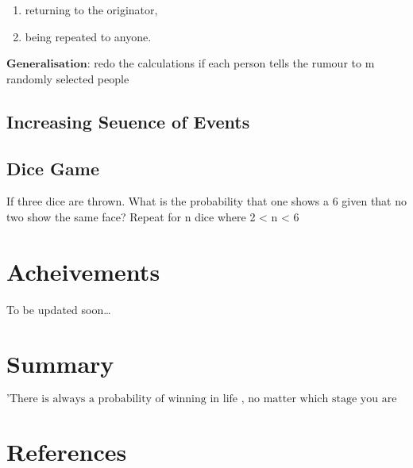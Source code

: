 \documentclass[
  letterpaper,
  DIV=11,
  numbers=noendperiod]{scrreprt}
\newlength{\cslhangindent}
\newenvironment{CSLReferences}[2] %
 {\begin{list}{}{%
  \setlength{\itemindent}{0pt}
  \setlength{\leftmargin}{0pt}
  \setlength{\parsep}{0pt}
  \ifodd #1
   \setlength{\leftmargin}{\cslhangindent}
   \setlength{\itemindent}{-1\cslhangindent}
  \fi
  \setlength{\itemsep}{#2\baselineskip}}}
 {\end{list}}
\begin{document}
\begin{enumerate}
\def\labelenumi{(\alph{enumi})}
\item
  returning to the originator,
\item
  being repeated to anyone.
\end{enumerate}

\(\textbf{Generalisation}\): redo the calculations if each person tells
the rumour to m randomly selected people

\section{Increasing Seuence of
Events}\label{increasing-seuence-of-events}

\section{Dice Game}\label{dice-game}

If three dice are thrown. What is the probability that one shows a 6
given that no two show the same face? Repeat for n dice where 2
\textless{} n \textless{} 6


\chapter{Acheivements}\label{acheivements}

To be updated soon\ldots{}


\chapter{Summary}\label{summary}

\(\text{'There is always a probability of winning in life , no matter which stage you are at. Just believe in yourself and make the best choice.'}\)


\chapter*{References}\label{references}


\label{refs}
\begin{CSLReferences}{0}{1}
\end{CSLReferences}
\end{document}
